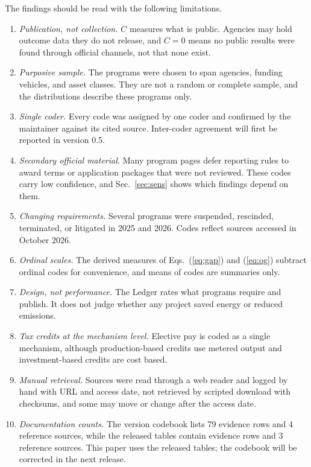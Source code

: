 \documentclass[10pt,twocolumn,letterpaper]{article}
\begin{document}
The findings should be read with the following limitations.
\begin{enumerate}
\item \textit{Publication, not collection.} $C$ measures what is public. Agencies may hold outcome data they do not release, and $C = 0$ means no public results were found through official channels, not that none exist.
\item \textit{Purposive sample.} The \nProg{} programs were chosen to span agencies, funding vehicles, and asset classes. They are not a random or complete sample, and the distributions describe these programs only.
\item \textit{Single coder.} Every code was assigned by one coder and confirmed by the maintainer against its cited source. Inter-coder agreement will first be reported in version 0.5.
\item \textit{Secondary official material.} Many program pages defer reporting rules to award terms or application packages that were not reviewed. These codes carry low confidence, and Sec.~\ref{sec:sens} shows which findings depend on them.
\item \textit{Changing requirements.} Several programs were suspended, rescinded, terminated, or litigated in 2025 and 2026. Codes reflect sources accessed in October 2026.
\item \textit{Ordinal scales.} The derived measures of Eqs.~(\ref{eq:gap}) and (\ref{eq:og}) subtract ordinal codes for convenience, and means of codes are summaries only.
\item \textit{Design, not performance.} The Ledger rates what programs require and publish. It does not judge whether any project saved energy or reduced emissions.
\item \textit{Tax credits at the mechanism level.} Elective pay is coded as a single mechanism, although production-based credits use metered output and investment-based credits are cost based.
\item \textit{Manual retrieval.} Sources were read through a web reader and logged by hand with URL and access date, not retrieved by scripted download with checksums, and some may move or change after the access date.
\item \textit{Documentation counts.} The version \vglVersion{} codebook lists 79 evidence rows and 4 reference sources, while the released tables contain \nEvid{} evidence rows and 3 reference sources. This paper uses the released tables; the codebook will be corrected in the next release.
\end{enumerate}
\end{document}
